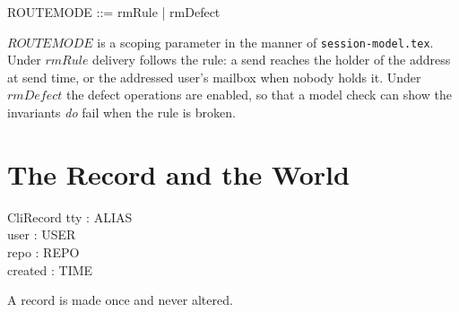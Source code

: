 \documentclass[a4paper,10pt,fleqn]{article}
\begin{document}
\begin{zed}
  ROUTEMODE ::= rmRule | rmDefect
\end{zed}

$ROUTEMODE$ is a scoping parameter in the manner of
\texttt{session-model.tex}.  Under $rmRule$ delivery follows the rule:
a send reaches the holder of the address at send time, or the addressed
user's mailbox when nobody holds it.  Under $rmDefect$ the defect
operations are enabled, so that a model check can show the invariants
\emph{do} fail when the rule is broken.

\section{The Record and the World}

\begin{schema}{CliRecord}
  tty : ALIAS \\
  user : USER \\
  repo : REPO \\
  created : TIME
\end{schema}

A record is made once and never altered.
\end{document}
